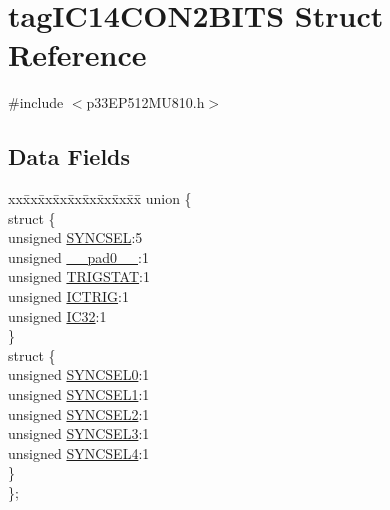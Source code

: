 \hypertarget{structtag_i_c14_c_o_n2_b_i_t_s}{}\section{tag\+I\+C14\+C\+O\+N2\+B\+I\+TS Struct Reference}
\label{structtag_i_c14_c_o_n2_b_i_t_s}


{\ttfamily \#include $<$p33\+E\+P512\+M\+U810.\+h$>$}

\subsection*{Data Fields}
\begin{DoxyCompactItemize}
\item 
\begin{tabbing}
xx\=xx\=xx\=xx\=xx\=xx\=xx\=xx\=xx\=\kill
union \{\\
\>struct \{\\
\>\>unsigned \hyperlink{structtag_i_c14_c_o_n2_b_i_t_s_a35fbbe11485c2615ed27535b62c3fa35}{SYNCSEL}:5\\
\>\>unsigned \hyperlink{structtag_i_c14_c_o_n2_b_i_t_s_adf71f3d8410c1f1dbbc96680a92c49af}{\_\_pad0\_\_}:1\\
\>\>unsigned \hyperlink{structtag_i_c14_c_o_n2_b_i_t_s_ab379549de54ac93ad4aa73686c34cb7c}{TRIGSTAT}:1\\
\>\>unsigned \hyperlink{structtag_i_c14_c_o_n2_b_i_t_s_a79bd14cfd2e403f3a96ce0b3bb58097b}{ICTRIG}:1\\
\>\>unsigned \hyperlink{structtag_i_c14_c_o_n2_b_i_t_s_afc705120246cb4ca0c93c87817519b7f}{IC32}:1\\
\>\} \\
\>struct \{\\
\>\>unsigned \hyperlink{structtag_i_c14_c_o_n2_b_i_t_s_a3b5df3154fde5141e6ac0156425ff8b4}{SYNCSEL0}:1\\
\>\>unsigned \hyperlink{structtag_i_c14_c_o_n2_b_i_t_s_a50e73f95ab1c258ddc64f69c0991deaf}{SYNCSEL1}:1\\
\>\>unsigned \hyperlink{structtag_i_c14_c_o_n2_b_i_t_s_a304907a5d2c4cbf1114a54642a85951e}{SYNCSEL2}:1\\
\>\>unsigned \hyperlink{structtag_i_c14_c_o_n2_b_i_t_s_a6bbd1bd2ead6c9fa713969c6eb0f0c75}{SYNCSEL3}:1\\
\>\>unsigned \hyperlink{structtag_i_c14_c_o_n2_b_i_t_s_a0cd5bbe196c7974953909d27a6307bb7}{SYNCSEL4}:1\\
\>\} \\
\}; \\

\end{tabbing}\end{DoxyCompactItemize}


